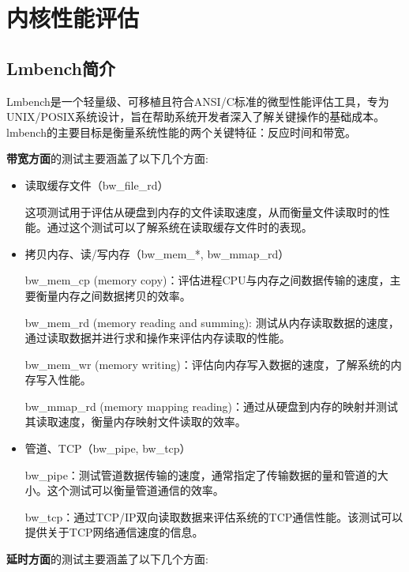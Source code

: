 \chapter{内核性能评估}

\section{Lmbench简介}

Lmbench是一个轻量级、可移植且符合ANSI/C标准的微型性能评估工具，专为UNIX/POSIX系统设计，旨在帮助系统开发者深入了解关键操作的基础成本。
lmbench的主要目标是衡量系统性能的两个关键特征：反应时间和带宽。

\textbf{带宽方面}的测试主要涵盖了以下几个方面:

\begin{itemize}
	
	\item 读取缓存文件（bw\_file\_rd）
	
	这项测试用于评估从硬盘到内存的文件读取速度，从而衡量文件读取时的性能。通过这个测试可以了解系统在读取缓存文件时的表现。
	
	\item 拷贝内存、读/写内存（bw\_mem\_*, bw\_mmap\_rd）
	
	bw\_mem\_cp (memory copy)：评估进程CPU与内存之间数据传输的速度，主要衡量内存之间数据拷贝的效率。
	
	bw\_mem\_rd (memory reading and summing): 测试从内存读取数据的速度，通过读取数据并进行求和操作来评估内存读取的性能。
	
	bw\_mem\_wr (memory writing)：评估向内存写入数据的速度，了解系统的内存写入性能。
	
	bw\_mmap\_rd (memory mapping reading)：通过从硬盘到内存的映射并测试其读取速度，衡量内存映射文件读取的效率。
	
	\item 管道、TCP（bw\_pipe, bw\_tcp）
	
	bw\_pipe：测试管道数据传输的速度，通常指定了传输数据的量和管道的大小。这个测试可以衡量管道通信的效率。
	
	bw\_tcp：通过TCP/IP双向读取数据来评估系统的TCP通信性能。该测试可以提供关于TCP网络通信速度的信息。
	
\end{itemize}

\textbf{延时方面}的测试主要涵盖了以下几个方面:

